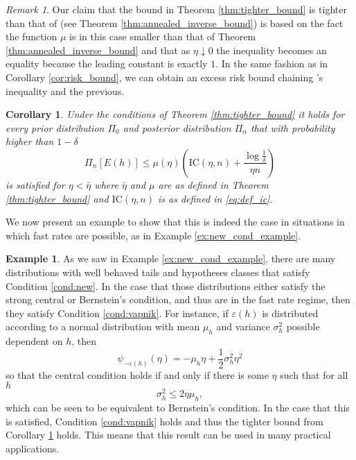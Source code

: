 \documentclass{uvamath}
\newcommand*{\paren}[1]{\left(#1\right)}
\newcommand*{\IC}{\mathrm{IC}}
\newtheorem{corollary}[theorem]{Corollary}
\theoremstyle{remark}
\newtheorem{remark}[theorem]{Remark}
\theoremstyle{definition}
\theoremstyle{definition}
\theoremstyle{definition}
\newtheorem{example}[theorem]{Example}
\theoremstyle{definition}
\theoremstyle{definition}
\begin{document}
\begin{remark}
  Our claim that the bound in Theorem \ref{thm:tighter_bound} is
  tighter than that of \citet{grunwald_fast_2016} (see Theorem
  \ref{thm:annealed_inverse_bound}) is based on the fact the function
  $\mu$ is in this case smaller than that of Theorem
  \ref{thm:annealed_inverse_bound} and that as $\eta\downarrow 0$ the
  inequality becomes an equality because the leading constant is
  exactly $1$. In the same fashion as in Corollary
  \ref{cor:risk_bound}, we can obtain an excess risk bound chaining
  \citeauthor{zhang_information-theoretic_2006}'s inequality and the
  previous.
\end{remark}

\begin{corollary}\label{cor:tighter_excess_bound}
  Under the conditions of Theorem \ref{thm:tighter_bound} it holds for
  every prior distribution $\Pi_0$ and posterior distribution $\Pi_n$
  that with probability higher than $1-\delta$
  \begin{equation*}
    \Pi_n[E(h)]\leq \mu(\eta)\paren{\IC(\eta, n) +
      \frac{\log\frac{1}{\delta}}{\eta n}}
  \end{equation*}
  is satisfied for $\eta<\bar{\eta}$ where $\bar{\eta}$ and $\mu$ are
  as defined in Theorem \ref{thm:tighter_bound} and $\IC(\eta, n)$ is
  as defined in \eqref{eq:def_ic}.
\end{corollary}

We now present an example to show that this is indeed the case in
situations in which fast rates are possible, as in Example
\ref{ex:new_cond_example}.
\begin{example}
  As we saw in Example \ref{ex:new_cond_example}, there are many
  distributions with well behaved tails and hypotheses classes that
  satisfy Condition \ref{cond:new}. In the case that those
  distributions either satisfy the strong central or Bernstein's
  condition, and thus are in the fast rate regime, then they satisfy
  Condition \ref{cond:vapnik}. For instance, if $\varepsilon(h)$ is
  distributed according to a normal distribution with mean $\mu_h$ and
  variance $\sigma^2_h$ possible dependent on $h$, then
  \begin{equation*}
    \psi_{-\varepsilon(h)}(\eta) = -\mu_h\eta + \frac{1}{2}\sigma_h^2\eta^2
  \end{equation*}
  so that the central condition holds if and only if there is some
  $\eta$ such that for all $h$
  \begin{equation*}
    \sigma_h^2 \leq 2\eta\mu_h,
  \end{equation*}
  which can be seen to be equivalent to Bernstein's condition. In the
  case that this is satisfied, Condition \ref{cond:vapnik} holds and
  thus the tighter bound from Corollary \ref{cor:tighter_excess_bound}
  holds. This means that this result can be used in many practical
  applications.
\end{example}
\end{document}
